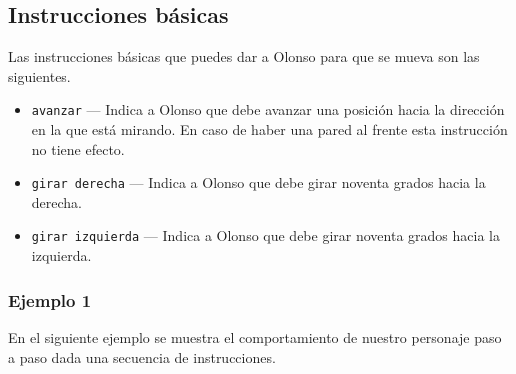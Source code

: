 \documentclass{oci}
\begin{document}
\begin{problemDescription}
\subsection*{Instrucciones básicas}
Las instrucciones básicas que puedes dar a Olonso para que se mueva son las siguientes.
\begin{itemize}
\item \texttt{avanzar} --- Indica a Olonso que debe avanzar una posición hacia la dirección en la que está mirando.
En caso de haber una pared al frente esta instrucción no tiene efecto.
\item \texttt{girar derecha} --- Indica a Olonso que debe girar noventa grados hacia la derecha.
\item \texttt{girar izquierda} --- Indica a Olonso que debe girar noventa grados hacia la izquierda.
\end{itemize}

\subsubsection*{Ejemplo 1}
En el siguiente ejemplo se muestra el comportamiento de nuestro personaje paso a paso dada una secuencia de instrucciones.


\end{problemDescription}
\end{document}
